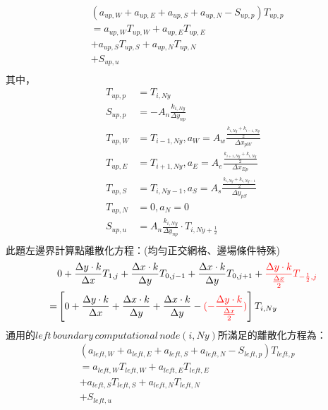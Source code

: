 \documentclass[12pt]{article}
\begin{document}
\begin{equation}
    \begin{split}
        &(a_{up,W}+ a_{up,E}+ a_{up,S}+ a_{up,N}-S_{up,p})T_{up,p} \\
        &= a_{up,W}T_{up,W} + a_{up,E}T_{up,E} \\
        &+  a_{up,S}T_{up,S} + a_{up,N}T_{up,N} \\
        & + S_{up,u} \\
    \end{split}
\end{equation}
\noindent 其中，
\begin{equation}
    \begin{split}
        T_{up,p} &= T_{i,Ny} \\
        S_{up,p} &= -A_{n}\frac{k_{i,Ny}}{\Delta y_{np}}\\
        T_{up,W} &= T_{i-1,Ny}, a_{W} = A_{w}\frac{\frac{k_{i,Ny}+k_{i-1,Ny}}{2}}{ \Delta x_{pW}} \\
        T_{up,E} &= T_{i+1,Ny}, a_{E} = A_{e}\frac{\frac{k_{i+1,Ny}+k_{i,Ny}}{2}}{\Delta x_{Ep}}\\
        T_{up,S} &= T_{i,Ny-1}, a_{S} = A_{s}\frac{\frac{k_{i,Ny}+k_{i,Ny-1}}{2}}{\Delta y_{pS}}\\
        T_{up,N} &= 0 ,a_{N} = 0 \\
        S_{up,u} &=A_{n}\frac{k_{i,Ny}}{\Delta y_{np}}\cdot T_{i,Ny+\frac{1}{2}}\\
    \end{split}
\end{equation}
\noindent 此題左邊界計算點離散化方程：(均勻正交網格、邊場條件特殊)\\
\begin{equation}
    \begin{split}
 & 0 +  \frac{\Delta y \cdot k}{\Delta x}T_{1,j}+
 \frac{\Delta x \cdot k}{\Delta y}T_{0,j-1}+ \frac{\Delta x   \cdot k }{\Delta y}T_{0,j+1} + {\color{red}\frac{\Delta y\cdot k }{\frac{\Delta x}{2}}T_{-\frac{1}{2},j}}\\
=&\left[0+ \frac{\Delta y   \cdot k }{\Delta x}+ \frac{\Delta x \cdot k }{\Delta y} + \frac{\Delta x   \cdot k }{\Delta y} -{\color{red} ( -  \frac{\Delta y\cdot k }{\frac{\Delta x}{2}})}\right]T_{i,Ny}  \\
\end{split}
\end{equation}
\noindent 通用的$left\,boundary\,computational\,node (i,Ny)$所滿足的離散化方程為：\\
\begin{equation}
\begin{split}
    &(a_{left,W}+a_{left,E}+a_{left,S}+a_{left,N}-S_{left,p})T_{left,p}\\
    &= a_{left,W}T_{left,W} + a_{left,E}T_{left,E} \\
    &+a_{left,S}T_{left,S} + a_{left,N}T_{left,N}\\
    &+S_{left,u}\\
\end{split}
\end{equation}
\end{document}
